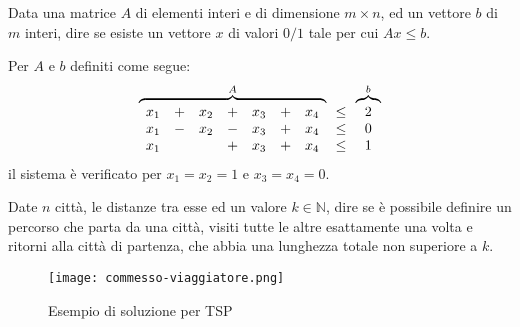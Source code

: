 \begin{problem}
    Data una matrice $A$ di elementi interi e di dimensione $m\times n$, ed un
    vettore $b$ di $m$ interi, dire se esiste un vettore $x$ di valori $0/1$
    tale per cui $Ax\leq b$.
\end{problem}
\begin{eg}
    Per $A$ e $b$ definiti come segue:
    \[\overbrace{\begin{array}[b]{ccccccc}
        x_1 & + & x_2 & + & x_3 & + & x_4\\
        x_1 & - & x_2 & - & x_3 & + & x_4\\
        x_1 &   &    & + & x_3 & + & x_4\\
    \end{array}}^{A}\begin{array}[b]{c}
        \leq\\
        \leq\\
        \leq\\
    \end{array}\overbrace{\begin{array}[b]{c}
        2\\
        0\\
        1\\
    \end{array}}^{b}\]
    il sistema è verificato per $x_1=x_2=1$ e $x_3=x_4=0$.
\end{eg}

\begin{problem}
    Date $n$ città, le distanze tra esse ed un valore $k\in\mathbb{N}$, dire se
    è possibile definire un percorso che parta da una città, visiti tutte le
    altre esattamente una volta e ritorni alla città di partenza, che abbia
    una lunghezza totale non superiore a $k$.
\end{problem}
\begin{figure}[h!]
    \centering
    \texttt{[image: commesso-viaggiatore.png]}
    \caption{Esempio di soluzione per TSP}
\end{figure}

